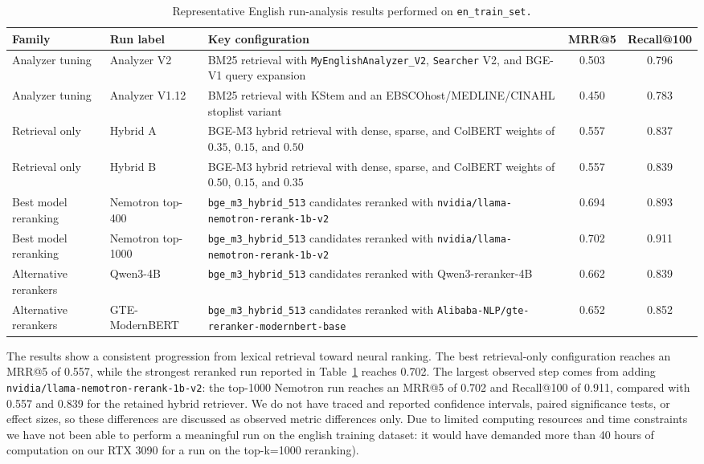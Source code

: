 \begin{table}[htbp]
    \centering
    \footnotesize
    \caption{Representative English run-analysis results performed on \texttt{en\_train\_set.}}
    \label{tab:main-results}
    \begin{tabular}{p{2.4cm} p{3.0cm} p{6.2cm} c c}
        \toprule
        Family & Run label & Key configuration & MRR@5 & Recall@100 \\
        \midrule
        Analyzer tuning & Analyzer V2 & BM25 retrieval with \texttt{MyEnglishAnalyzer\_V2}, \texttt{Searcher} V2, and BGE-V1 query expansion & 0.503 & 0.796 \\
        Analyzer tuning & Analyzer V1.12 & BM25 retrieval with KStem and an EBSCOhost/MEDLINE/CINAHL stoplist variant & 0.450 & 0.783 \\
        Retrieval only & Hybrid A & BGE-M3 hybrid retrieval with dense, sparse, and ColBERT weights of $0.35$, $0.15$, and $0.50$ & 0.557 & 0.837 \\
        Retrieval only & Hybrid B & BGE-M3 hybrid retrieval with dense, sparse, and ColBERT weights of $0.50$, $0.15$, and $0.35$ & 0.557 & 0.839 \\
        Best model reranking & Nemotron top-400 & \texttt{bge\_m3\_hybrid\_513} candidates reranked with \nolinkurl{nvidia/llama-nemotron-rerank-1b-v2} & 0.694 & 0.893 \\
        Best model reranking & Nemotron top-1000 & \texttt{bge\_m3\_hybrid\_513} candidates reranked with \nolinkurl{nvidia/llama-nemotron-rerank-1b-v2} & 0.702 & 0.911 \\
        Alternative rerankers & Qwen3-4B & \texttt{bge\_m3\_hybrid\_513} candidates reranked with Qwen3-reranker-4B & 0.662 & 0.839 \\
        Alternative rerankers & GTE-ModernBERT & \texttt{bge\_m3\_hybrid\_513} candidates reranked with \nolinkurl{Alibaba-NLP/gte-reranker-modernbert-base} & 0.652 & 0.852 \\
        \bottomrule
    \end{tabular}
\end{table}

The results show a consistent progression from lexical retrieval toward neural ranking. The best retrieval-only configuration reaches an MRR@5 of 0.557, while the strongest reranked run reported in Table~\ref{tab:main-results} reaches 0.702. The largest observed step comes from adding 
\\\texttt{nvidia/llama-nemotron-rerank-1b-v2}: the top-1000 Nemotron run reaches an MRR@5 of 0.702 and Recall@100 of 0.911, compared with 0.557 and 0.839 for the retained hybrid retriever. We do not have traced and reported confidence intervals, paired significance tests, or effect sizes, so these differences are discussed as observed metric differences only. Due to limited computing resources and time constraints we have not been able to perform a meaningful run on the english training dataset: it would have demanded more than 40 hours of computation on our RTX 3090 for a run on the top-k=1000 reranking).


